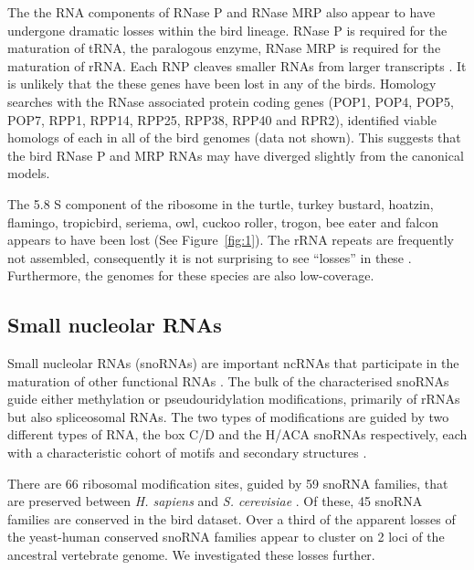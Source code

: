 \documentclass[10pt]{bmc_article}
\newenvironment{bmcformat}{\begin{raggedright}\baselineskip20pt\sloppy\setboolean{publ}{false}}{\end{raggedright}\baselineskip20pt\sloppy}
\begin{document}
\begin{bmcformat}
The the RNA components of RNase P and RNase MRP also appear to have
undergone dramatic losses within the bird lineage. RNase P is required
for the maturation of tRNA, the paralogous enzyme, RNase MRP is
required for the maturation of rRNA. Each RNP cleaves smaller RNAs
from larger transcripts \cite{Lopez:2009}. It is unlikely that the
these genes have been lost in any of the birds. Homology searches with
the RNase associated protein coding genes (POP1, POP4, POP5, POP7,
RPP1, RPP14, RPP25, RPP38, RPP40 and RPR2), identified viable homologs
of each in all of the bird genomes \cite{Rosenblad:2006} (data not
shown). This suggests that the bird RNase P and MRP RNAs may have
diverged slightly from the canonical models.

The 5.8 S component of the ribosome in the turtle, turkey bustard,
hoatzin, flamingo, tropicbird, seriema, owl, cuckoo roller, trogon,
bee eater and falcon appears to have been lost (See
Figure~\ref{fig:1}). The rRNA repeats are frequently not assembled,
consequently it is not surprising to see ``losses'' in these \cite{Floutsakou:2013}.
Furthermore, the genomes for these species are also
low-coverage.


\subsection*{Small nucleolar RNAs}

Small nucleolar RNAs (snoRNAs) are important ncRNAs that participate
in the maturation of other functional RNAs \cite{Gardner:2010}. The
bulk of the characterised snoRNAs guide either methylation or
pseudouridylation modifications, primarily of rRNAs but also
spliceosomal RNAs. The two types of modifications are guided by two
different types of RNA, the box C/D and the H/ACA snoRNAs
respectively, each with a characteristic cohort of motifs and
secondary structures \cite{Marz:2011}.

There are 66 ribosomal modification sites, guided by 59 snoRNA
families, that are preserved between \emph{H. sapiens} and
\emph{S. cerevisiae} \cite{Lestrade:2006}. Of these, 45 snoRNA
families are conserved in the bird dataset.
Over a third of the apparent losses of the yeast-human conserved
snoRNA families appear to cluster on 2 loci of the ancestral
vertebrate genome. We investigated these losses further.


\end{bmcformat}
\end{document}
